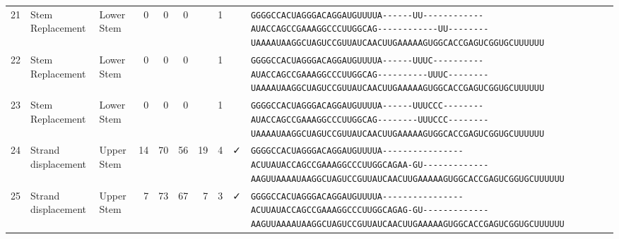 \begin{tabular}{rllrrrrrcl}
 21 & Stem Replacement & Lower Stem & 0 & 0 & 0 &  & 1 &  &
 \color{ucsfdarkgrey}\verb|GGGGCCACUAGGGACAGGAU|\color{ucsforange}\verb|GUUUUA|\color{ucsfblue}\verb|------UU------------|\color{ucsfpurple}\verb|AUACCAGCCGAAAGGCCCUUGGCAG|\color{ucsfblue}\verb|------------UU--------|\color{ucsforange}\verb|UAAAAUAA|\color{ucsfnavy}\verb|GGCUAGUCC|\color{ucsforange}\verb|GUUAUCA|\color{ucsfteal}\verb|ACUUGAAAAAGU|\color{ucsforange}\verb|GGCACCGAGUCGGUGCUUUUUU| \\

 22 & Stem Replacement & Lower Stem & 0 & 0 & 0 &  & 1 &  &
 \color{ucsfdarkgrey}\verb|GGGGCCACUAGGGACAGGAU|\color{ucsforange}\verb|GUUUUA|\color{ucsfblue}\verb|------UUUC----------|\color{ucsfpurple}\verb|AUACCAGCCGAAAGGCCCUUGGCAG|\color{ucsfblue}\verb|----------UUUC--------|\color{ucsforange}\verb|UAAAAUAA|\color{ucsfnavy}\verb|GGCUAGUCC|\color{ucsforange}\verb|GUUAUCA|\color{ucsfteal}\verb|ACUUGAAAAAGU|\color{ucsforange}\verb|GGCACCGAGUCGGUGCUUUUUU| \\

 23 & Stem Replacement & Lower Stem & 0 & 0 & 0 &  & 1 &  &
 \color{ucsfdarkgrey}\verb|GGGGCCACUAGGGACAGGAU|\color{ucsforange}\verb|GUUUUA|\color{ucsfblue}\verb|------UUUCCC--------|\color{ucsfpurple}\verb|AUACCAGCCGAAAGGCCCUUGGCAG|\color{ucsfblue}\verb|--------UUUCCC--------|\color{ucsforange}\verb|UAAAAUAA|\color{ucsfnavy}\verb|GGCUAGUCC|\color{ucsforange}\verb|GUUAUCA|\color{ucsfteal}\verb|ACUUGAAAAAGU|\color{ucsforange}\verb|GGCACCGAGUCGGUGCUUUUUU| \\

 24 & Strand displacement & Upper Stem & 14 & 70 & 56 & 19 & 4 & ✓ &
 \color{ucsfdarkgrey}\verb|GGGGCCACUAGGGACAGGAU|\color{ucsforange}\verb|GUUUUA|\color{ucsfblue}\verb|----------------ACUU|\color{ucsfpurple}\verb|AUACCAGCCGAAAGGCCCUUGGCAG|\color{ucsfblue}\verb|AA-GU-------------AAGU|\color{ucsforange}\verb|UAAAAUAA|\color{ucsfnavy}\verb|GGCUAGUCC|\color{ucsforange}\verb|GUUAUCA|\color{ucsfteal}\verb|ACUUGAAAAAGU|\color{ucsforange}\verb|GGCACCGAGUCGGUGCUUUUUU| \\

 25 & Strand displacement & Upper Stem & 7 & 73 & 67 & 7 & 3 & ✓ &
 \color{ucsfdarkgrey}\verb|GGGGCCACUAGGGACAGGAU|\color{ucsforange}\verb|GUUUUA|\color{ucsfblue}\verb|----------------ACUU|\color{ucsfpurple}\verb|AUACCAGCCGAAAGGCCCUUGGCAG|\color{ucsfblue}\verb|AG-GU-------------AAGU|\color{ucsforange}\verb|UAAAAUAA|\color{ucsfnavy}\verb|GGCUAGUCC|\color{ucsforange}\verb|GUUAUCA|\color{ucsfteal}\verb|ACUUGAAAAAGU|\color{ucsforange}\verb|GGCACCGAGUCGGUGCUUUUUU| \\


\end{tabular}
